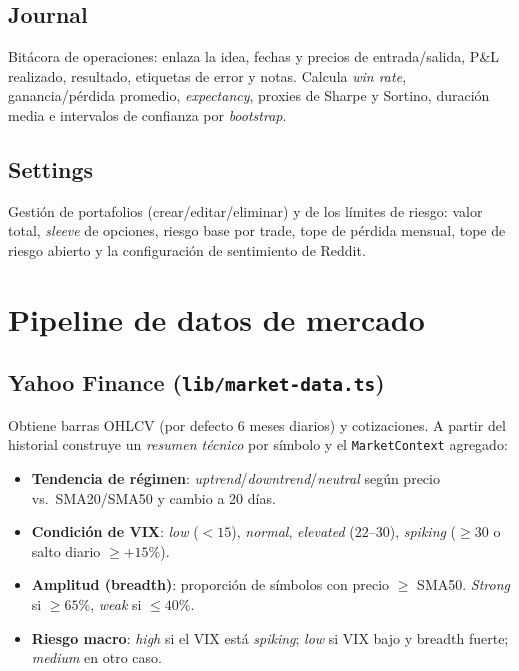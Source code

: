\documentclass[11pt,letterpaper]{article}
\begin{document}
\subsection{Journal}
Bitácora de operaciones: enlaza la idea, fechas y precios de entrada/salida, P\&L
realizado, resultado, etiquetas de error y notas. Calcula \emph{win rate},
ganancia/pérdida promedio, \emph{expectancy}, proxies de Sharpe y Sortino,
duración media e intervalos de confianza por \emph{bootstrap}.

\subsection{Settings}
Gestión de portafolios (crear/editar/eliminar) y de los límites de riesgo:
valor total, \emph{sleeve} de opciones, riesgo base por trade, tope de pérdida
mensual, tope de riesgo abierto y la configuración de sentimiento de Reddit.

\section{Pipeline de datos de mercado}

\subsection{Yahoo Finance (\texttt{lib/market-data.ts})}
Obtiene barras OHLCV (por defecto 6 meses diarios) y cotizaciones. A partir del
historial construye un \emph{resumen técnico} por símbolo y el
\texttt{MarketContext} agregado:

\begin{itemize}[noitemsep]
  \item \textbf{Tendencia de régimen}: \emph{uptrend}/\emph{downtrend}/\emph{neutral}
        según precio vs.\ SMA20/SMA50 y cambio a 20 días.
  \item \textbf{Condición de VIX}: \emph{low} ($<15$), \emph{normal},
        \emph{elevated} ($22$--$30$), \emph{spiking} ($\ge 30$ o salto diario
        $\ge +15\%$).
  \item \textbf{Amplitud (breadth)}: proporción de símbolos con precio
        $\ge$ SMA50. \emph{Strong} si $\ge 65\%$, \emph{weak} si $\le 40\%$.
  \item \textbf{Riesgo macro}: \emph{high} si el VIX está \emph{spiking};
        \emph{low} si VIX bajo y breadth fuerte; \emph{medium} en otro caso.
\end{itemize}
\end{document}
